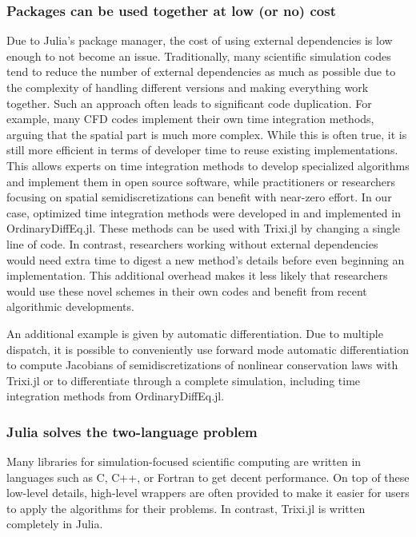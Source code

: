 \documentclass[hidelinks]{juliacon} %
\newcommand{\trixi}{Trixi.jl\xspace}
\begin{document}
\subsubsection{Packages can be used together at low (or no) cost}

Due to Julia's package manager, the cost of using external dependencies is low
enough to not become an issue. Traditionally, many scientific simulation codes tend
to reduce the number of external dependencies as much as possible due to the
complexity of handling different versions and making everything work together.
Such an approach often leads to significant code duplication. For example, many
CFD codes implement their own time integration methods, arguing that the spatial
part is much more complex. While this is often true, it is still more efficient
in terms of developer time to reuse existing implementations. This
allows experts on time integration methods to develop specialized algorithms and
implement them in open source software, while practitioners or researchers focusing
on spatial semidiscretizations can benefit with near-zero effort.
In our case, optimized time integration methods were developed in
\cite{ranocha2021optimized} and implemented in OrdinaryDiffEq.jl. These methods
can be used with \trixi by changing a single line of code. In contrast, researchers
working without external dependencies would need extra time to digest a new method's
details before even beginning an implementation. This additional overhead
makes it less likely that researchers would use these novel schemes in their own
codes and benefit from recent algorithmic developments.

An additional example is given by automatic differentiation. Due to multiple dispatch,
it is possible to conveniently use forward mode automatic differentiation
\cite{revels2016forward} to compute Jacobians of semidiscretizations of nonlinear
conservation laws with \trixi or to differentiate through a complete simulation,
including time integration methods from OrdinaryDiffEq.jl.

\subsubsection{Julia solves the two-language problem}

Many libraries for simulation-focused scientific computing are written in
languages such as C, C++, or Fortran to get decent performance. On top of these
low-level details, high-level wrappers are often provided to make it easier
for users to apply the algorithms for their problems. In contrast, \trixi is
written completely in Julia.
\end{document}
